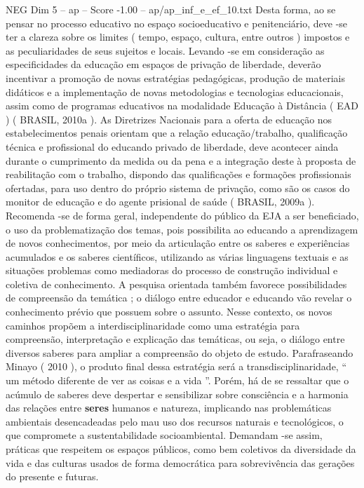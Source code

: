 \begin{textsample}{NEG Dim 5 – ap – Score -1.00 – ap/ap\_inf\_e\_ef\_10.txt}
Desta forma, ao se pensar no processo educativo no espaço socioeducativo e penitenciário, deve -se ter a clareza sobre os limites ( tempo, espaço, cultura, entre outros ) impostos e as peculiaridades de seus sujeitos e locais.
Levando -se em consideração as especificidades da educação em espaços de privação de liberdade, deverão incentivar a promoção de novas estratégias pedagógicas, produção de materiais didáticos e a implementação de novas metodologias e tecnologias educacionais, assim como de programas educativos na modalidade Educação à Distância ( EAD ) ( BRASIL, 2010a ).
As Diretrizes Nacionais para a oferta de educação nos estabelecimentos penais orientam que a relação educação/trabalho, qualificação técnica e profissional do educando privado de liberdade, deve acontecer ainda durante o cumprimento da medida ou da pena e a integração deste à proposta de reabilitação com o trabalho, dispondo das qualificações e formações profissionais ofertadas, para uso dentro do próprio sistema de privação, como são os casos do monitor de educação e do agente prisional de saúde ( BRASIL, 2009a ).
Recomenda -se de forma geral, independente do público da EJA a ser beneficiado, o uso da problematização dos temas, pois possibilita ao educando a aprendizagem de novos conhecimentos, por meio da articulação entre os saberes e experiências acumulados e os saberes científicos, utilizando as várias linguagens textuais e as situações problemas como mediadoras do processo de construção individual e coletiva de conhecimento.
A pesquisa orientada também favorece possibilidades de compreensão da temática ; o diálogo entre educador e educando vão revelar o conhecimento prévio que possuem sobre o assunto.
Nesse contexto, os novos caminhos propõem a interdisciplinaridade como uma estratégia para compreensão, interpretação e explicação das temáticas, ou seja, o diálogo entre diversos saberes para ampliar a compreensão do objeto de estudo.
Parafraseando Minayo ( 2010 ), o produto final dessa estratégia será a transdisciplinaridade, “ um método diferente de ver as coisas e a vida ”.
Porém, há de se ressaltar que o acúmulo de saberes deve despertar e sensibilizar sobre consciência e a harmonia das relações entre \textbf{seres} humanos e natureza, implicando nas problemáticas ambientais desencadeadas pelo mau uso dos recursos naturais e tecnológicos, o que compromete a sustentabilidade socioambiental.
Demandam -se assim, práticas que respeitem os espaços públicos, como bem coletivos da diversidade da vida e das culturas usados de forma democrática para sobrevivência das gerações do presente e futuras.

\end{textsample}
